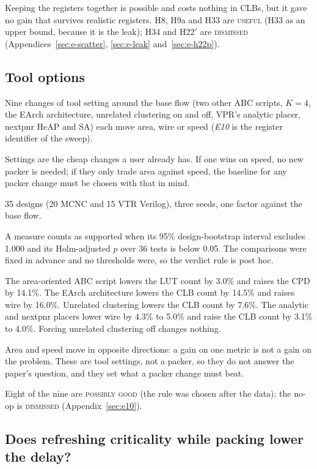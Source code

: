  Keeping the registers together is possible and costs nothing in CLBs, but it gave no gain that survives realistic registers. H8, H9a and H33 are \textsc{useful} (H33 as an upper bound, because it is the leak); H34 and H22$'$ are \textsc{dismissed} (Appendices~\ref{sec:e-scatter}, \ref{sec:e-leak} and~\ref{sec:e-h22p}).

\subsection{Tool options}
\label{sec:r-e10}

 Nine changes of tool setting around the base flow (two other ABC scripts, $K=4$, the EArch architecture, unrelated clustering on and off, VPR's analytic placer, nextpnr HeAP and SA) each move area, wire or speed (\emph{E10} is the register identifier of the sweep).

 Settings are the cheap changes a user already has. If one wins on speed, no new packer is needed; if they only trade area against speed, the baseline for any packer change must be chosen with that in mind.

 35 designs (20 MCNC and 15 VTR Verilog), three seeds, one factor against the base flow.

 A measure counts as supported when its 95\% design-bootstrap interval excludes 1.000 and its Holm-adjusted $p$ over 36 tests is below 0.05. The comparisons were fixed in advance and no thresholds were, so the verdict rule is post hoc.

 The area-oriented ABC script lowers the LUT count by 3.0\% and raises the CPD by 14.1\%. The EArch architecture lowers the CLB count by 14.5\% and raises wire by 16.0\%. Unrelated clustering lowers the CLB count by 7.6\%. The analytic and nextpnr placers lower wire by 4.3\% to 5.0\% and raise the CLB count by 3.1\% to 4.0\%. Forcing unrelated clustering off changes nothing.

 Area and speed move in opposite directions: a gain on one metric is not a gain on the problem. These are tool settings, not a packer, so they do not answer the paper's question, and they set what a packer change must beat.

 Eight of the nine are \textsc{possibly good} (the rule was chosen after the data); the no-op is \textsc{dismissed} (Appendix~\ref{sec:e10}).

\subsection{Does refreshing criticality while packing lower the delay?}
\label{sec:r-3}

